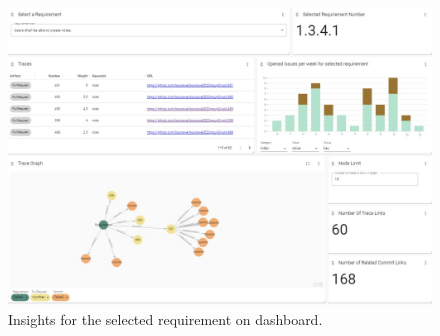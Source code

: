 \begin{figure}[htb]
    \centering
    \includegraphics[width=0.9\linewidth]{figs/perreq.jpg}
    \caption{Insights for the selected requirement on dashboard.}
    \label{fig:perreq}
\end{figure}